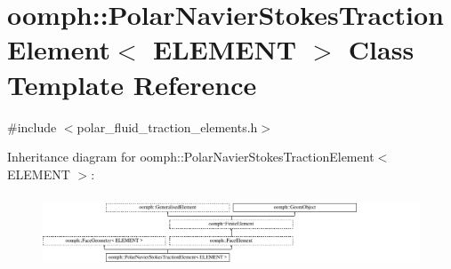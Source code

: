 \hypertarget{classoomph_1_1PolarNavierStokesTractionElement}{}\section{oomph\+:\+:Polar\+Navier\+Stokes\+Traction\+Element$<$ E\+L\+E\+M\+E\+NT $>$ Class Template Reference}
\label{classoomph_1_1PolarNavierStokesTractionElement}


{\ttfamily \#include $<$polar\+\_\+fluid\+\_\+traction\+\_\+elements.\+h$>$}

Inheritance diagram for oomph\+:\+:Polar\+Navier\+Stokes\+Traction\+Element$<$ E\+L\+E\+M\+E\+NT $>$\+:\begin{figure}[H]
\begin{center}
\leavevmode
\includegraphics[height=2.196079cm]{classoomph_1_1PolarNavierStokesTractionElement}
\end{center}
\end{figure}
